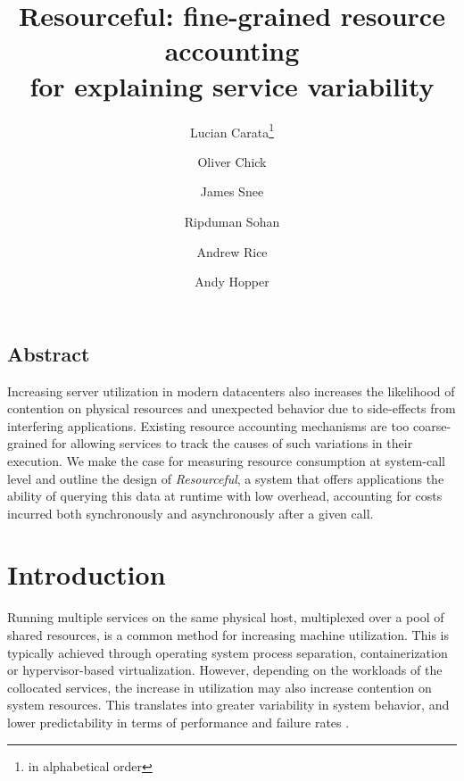 \documentclass[12pt,twoside,a4paper]{article}
\newcommand{\pname}{Resourceful}
\newcommand*\aorder[1][\value{footnote}]{\footnotemark[#1]}
\begin{document}
\date{}

\title{\Large \bf \pname: fine-grained resource accounting\\for explaining service variability}

\author{Lucian Carata\thanks{in alphabetical order}\aorder} \author{Oliver
Chick\aorder} \author{James Snee\aorder} \author{\authorcr{}Ripduman Sohan}
\author{Andrew Rice} \author{Andy Hopper} 

\maketitle

\setcounter{page}{3}


\subsection*{Abstract}
Increasing server utilization in modern datacenters also increases the
likelihood of contention on physical resources and unexpected behavior due to
side-effects from interfering applications. Existing resource accounting
mechanisms are too coarse-grained for allowing services to track the causes of
such variations in their execution. We make the case for measuring resource
consumption at system-call level and outline the design of \emph{Resourceful}, a
system that offers applications the ability of querying this data at runtime
with low overhead, accounting for costs incurred both synchronously and
asynchronously after a given call.

\section{Introduction} 
Running multiple services on the same physical host, multiplexed over a pool of
shared resources, is a common method for increasing machine utilization. This is
typically achieved through operating system process separation, containerization
or hypervisor-based virtualization. However, depending on the workloads
of the collocated services, the increase in utilization may also increase
contention on system resources. This translates into greater variability in
system behavior, and lower predictability in terms of performance and failure
rates \cite{dean2013}.
\end{document}
